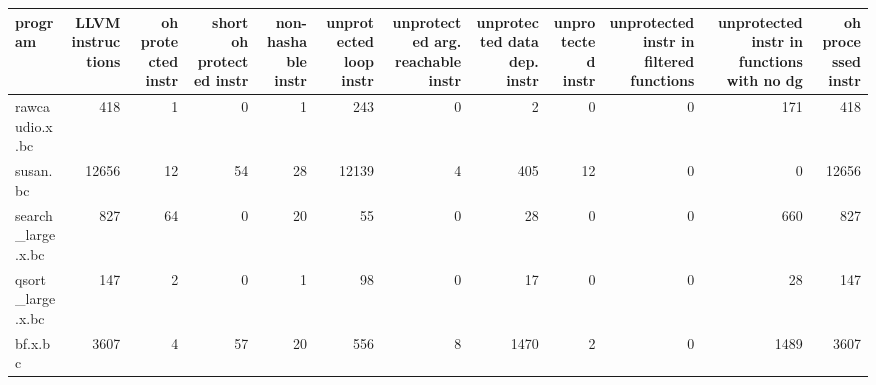 \begin{table}[ht]
\centering
\begin{adjustbox}{width=1.3\textwidth}

\begin{tabular}{lrrrrrrrrrrr}
\hline
 program              &   LLVM instructions &   oh protected instr &   short oh protected instr &   non-hashable instr &   unprotected loop instr &   unprotected arg. reachable instr &   unprotected data dep. instr &   unprotected instr &   unprotected instr in filtered functions &   unprotected instr in functions with no dg &   oh processed instr \\
\hline
 rawcaudio.x.bc       &                 418 &                    1 &                          0 &                    1 &                      243 &                                  0 &                             2 &                   0 &                                         0 &                                         171 &                  418 \\
 susan.bc             &               12656 &                   12 &                         54 &                   28 &                    12139 &                                  4 &                           405 &                  12 &                                         0 &                                           0 &                12656 \\
 search\_large.x.bc    &                 827 &                   64 &                          0 &                   20 &                       55 &                                  0 &                            28 &                   0 &                                         0 &                                         660 &                  827 \\
 qsort\_large.x.bc     &                 147 &                    2 &                          0 &                    1 &                       98 &                                  0 &                            17 &                   0 &                                         0 &                                          28 &                  147 \\
 bf.x.bc              &                3607 &                    4 &                         57 &                   20 &                      556 &                                  8 &                          1470 &                   2 &                                         0 &                                        1489 &                 3607 \\

\end{tabular}
\end{adjustbox}
\end{table}
